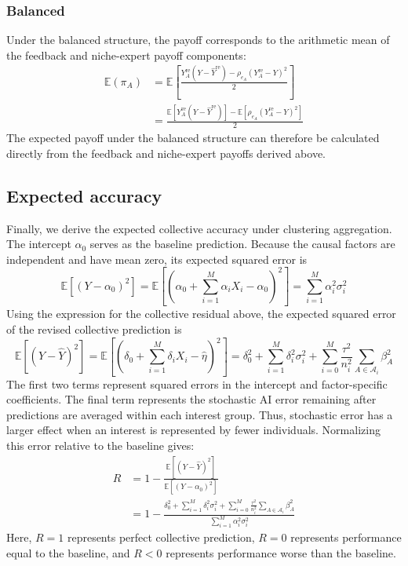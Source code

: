 \documentclass[12pt]{article}
\begin{document}
\subsubsection*{Balanced}

Under the balanced structure, the payoff corresponds to the arithmetic mean of the feedback and niche-expert payoff components:
\begin{align}
\mathbb{E}(\pi_{A})&=\mathbb{E}\left[\frac{Y_A^{\mathrm{re}}(Y-\hat{Y}^{\mathrm{re}}) - \rho_{e_A}(Y_A^{\mathrm{re}}-Y)^2}{2}\right]\\
&= \frac{\mathbb{E}\left[Y_A^{\mathrm{re}}(Y-\hat{Y}^{\mathrm{re}})\right] - \mathbb{E}\left[\rho_{e_A}(Y_A^{\mathrm{re}}-Y)^2\right]}{2}
\end{align}
The expected payoff under the balanced structure can therefore be calculated directly from the feedback and niche-expert payoffs derived above.

\subsection{Expected accuracy}

Finally, we derive the expected collective accuracy under clustering aggregation. The intercept $\alpha_0$ serves as the baseline prediction. 
Because the causal factors are independent and have mean zero, its expected squared error is
\begin{equation}
\mathbb{E}[(Y - \alpha_0)^2] = \mathbb{E}\left[\left(\alpha_0 +\sum_{i = 1}^{M}\alpha_iX_i - \alpha_0\right)^2\right] = \sum_{i = 1}^{M}\alpha_i^2\sigma_i^2
\end{equation}
Using the expression for the collective residual above, the expected squared error of the revised collective prediction is
\begin{equation}
\mathbb{E}[(Y - \hat{Y})^2] = \mathbb{E}\left[\left(\delta_0 +\sum_{i = 1}^{M}\delta_iX_i - \hat{\eta}\right)^2\right] = \delta_0^2 + \sum_{i = 1}^{M}\delta_i^2\sigma_i^2 + \sum_{i = 0}^{M}\frac{\tau^2}{n_i^2}\sum_{A \in \mathcal{A}_i}\beta_A^2
\end{equation}
The first two terms represent squared errors in the intercept and factor-specific coefficients. The final term represents the stochastic AI error remaining after predictions are averaged within each interest group. 
Thus, stochastic error has a larger effect when an interest is represented by fewer individuals. 
Normalizing this error relative to the baseline gives:
\begin{align}
R &= 1 - \frac{\mathbb{E}[(Y - \hat{Y})^2]}{\mathbb{E}[(Y - \alpha_0)^2]}\\[6pt]
&= 1- \frac{\delta_0^2 + \sum_{i = 1}^{M}\delta_i^2\sigma_i^2 + \sum_{i = 0}^{M}\frac{\tau^2}{n_i^2}\sum_{A \in \mathcal{A}_i}\beta_A^2}{\sum_{i = 1}^{M}\alpha_i^2\sigma_i^2}
\end{align}
Here, $R=1$ represents perfect collective prediction, $R=0$ represents performance equal to the baseline, and $R<0$ represents performance worse than the baseline.
\end{document}
